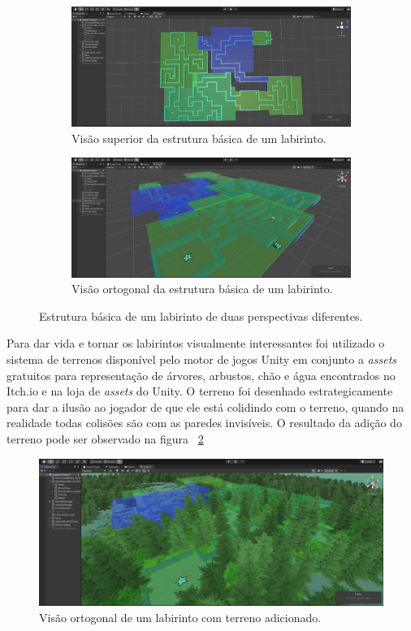 \documentclass[
	12pt,				%
	openright,			%
	twoside,			%
	a4paper,			%
	english,			%
	french,				%
	spanish,			%
	brazil				%
	]{abntex2}
\begin{document}
\begin{figure}[h!]
  \centering
  \begin{subfigure}[b]{0.75\linewidth}
    \includegraphics[width=\linewidth]{basicLab.png}
     \caption{Visão superior da estrutura básica de um labirinto.}
  \end{subfigure}
  \begin{subfigure}[b]{0.75\linewidth}
    \includegraphics[width=\linewidth]{basicLab2.png}
    \caption{Visão ortogonal da estrutura básica de um labirinto.}
  \end{subfigure}
  \caption{Estrutura básica de um labirinto de duas perspectivas diferentes.}
  \label{fig:basicLab}
\end{figure}

Para dar vida e tornar os labirintos visualmente interessantes foi utilizado o sistema de terrenos disponível pelo motor de jogos Unity em conjunto a \emph{assets} gratuitos para representação de árvores, arbustos, chão e água encontrados no Itch.io e na loja de \emph{assets} do Unity. O terreno foi desenhado estrategicamente para dar a ilusão ao jogador de que ele está colidindo com o terreno, quando na realidade todas colisões são com as paredes invisíveis. O resultado da adição do terreno pode ser observado na figura ~\ref{fig:terrain}

\begin{figure}[h!]
 \centering
  \includegraphics[width=0.75\linewidth]{prettyLab.png}
  \caption{Visão ortogonal de um labirinto com terreno adicionado.}
  \label{fig:terrain}
\end{figure}
\end{document}

